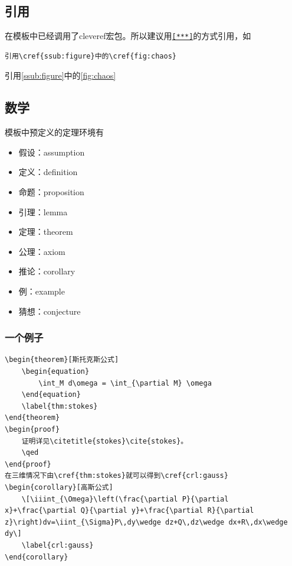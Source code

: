 \documentclass{LZU}
\newcommand{\package}[1]{{\sffamily #1}}
\begin{document}
\subsection{引用}
在模板中已经调用了\package{cleveref}宏包。所以建议用\texttt{\cref{***}}的方式引用，如
\begin{verbatim}
引用\cref{ssub:figure}中的\cref{fig:chaos}
\end{verbatim}
引用\cref{ssub:figure}中的\cref{fig:chaos}
\subsection{数学}
模板中预定义的定理环境有
\begin{itemize}
    \item 假设：assumption
    \item 定义：definition
    \item 命题：proposition
    \item 引理：lemma
    \item 定理：theorem
    \item 公理：axiom
    \item 推论：corollary
    \item 例：example
    \item 猜想：conjecture
\end{itemize}
\subsubsection{一个例子}
\begin{verbatim}
\begin{theorem}[斯托克斯公式]
    \begin{equation}
        \int_M d\omega = \int_{\partial M} \omega
    \end{equation}
    \label{thm:stokes}
\end{theorem}
\begin{proof}
    证明详见\citetitle{stokes}\cite{stokes}。
    \qed
\end{proof}
在三维情况下由\cref{thm:stokes}就可以得到\cref{crl:gauss}
\begin{corollary}[高斯公式]
    \[\iiint_{\Omega}\left(\frac{\partial P}{\partial x}+\frac{\partial Q}{\partial y}+\frac{\partial R}{\partial z}\right)dv=\iint_{\Sigma}P\,dy\wedge dz+Q\,dz\wedge dx+R\,dx\wedge dy\]
    \label{crl:gauss}
\end{corollary}
\end{verbatim}
\end{document}
